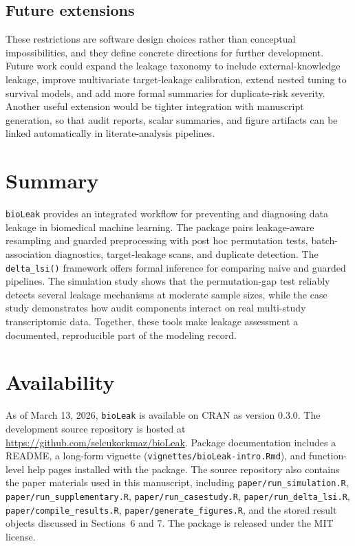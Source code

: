 \documentclass[article]{jss}
\begin{document}
\subsection{Future extensions}

These restrictions are software design choices rather than conceptual
impossibilities, and they define concrete directions for further development.
Future work could expand the leakage taxonomy to include external-knowledge
leakage, improve multivariate target-leakage calibration, extend nested tuning
to survival models, and add more formal summaries for duplicate-risk severity.
Another useful extension would be tighter integration with manuscript
generation, so that audit reports, scalar summaries, and figure artifacts can be
linked automatically in literate-analysis pipelines.

\section{Summary}

\texttt{bioLeak} provides an integrated  workflow for preventing
and diagnosing data leakage in biomedical machine learning. The package pairs
leakage-aware resampling and guarded preprocessing with post hoc permutation
tests, batch-association diagnostics, target-leakage scans, and duplicate
detection. The \texttt{delta\_lsi()} framework offers formal inference for
comparing naive and guarded pipelines. The simulation study shows that the
permutation-gap test reliably detects several leakage mechanisms at moderate
sample sizes, while the case study demonstrates how audit components interact
on real multi-study transcriptomic data. Together, these tools make leakage
assessment a documented, reproducible part of the modeling record.

\section{Availability}

As of March 13, 2026, \texttt{bioLeak} is available on CRAN as version 0.3.0.
The development source repository is hosted at
\url{https://github.com/selcukorkmaz/bioLeak}. Package documentation includes a
README, a long-form vignette (\texttt{vignettes/bioLeak-intro.Rmd}), and
function-level help pages installed with the package. The source repository also
contains the paper materials used in this manuscript, including
\texttt{paper/run\_simulation.R}, \texttt{paper/run\_supplementary.R},
\texttt{paper/run\_casestudy.R}, \texttt{paper/run\_delta\_lsi.R},
\texttt{paper/compile\_results.R}, \texttt{paper/generate\_figures.R}, and the
stored result objects discussed in Sections~6 and 7. The package is released
under the MIT license.
\end{document}
